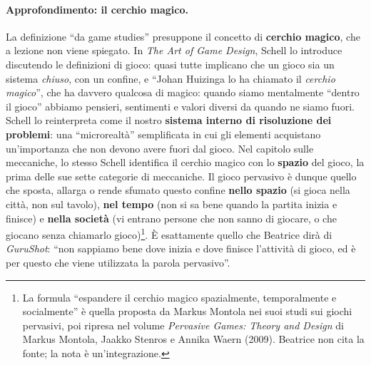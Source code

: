 \paragraph{Approfondimento: il cerchio magico.} La definizione ``da game
studies'' presuppone il concetto di \textbf{cerchio magico}, che a lezione non
viene spiegato. In \emph{The Art of Game Design}, Schell lo introduce
discutendo le definizioni di gioco: quasi tutte implicano che un gioco sia un
sistema \emph{chiuso}, con un confine, e ``Johan Huizinga lo ha chiamato il
\emph{cerchio magico}'', che ha davvero qualcosa di magico: quando siamo
mentalmente ``dentro il gioco'' abbiamo pensieri, sentimenti e valori diversi da
quando ne siamo fuori. Schell lo reinterpreta come il nostro \textbf{sistema
interno di risoluzione dei problemi}: una ``microrealtà'' semplificata in cui gli
elementi acquistano un'importanza che non devono avere fuori dal gioco. Nel
capitolo sulle meccaniche, lo stesso Schell identifica il cerchio magico con lo
\textbf{spazio} del gioco, la prima delle sue sette categorie di meccaniche. Il
gioco pervasivo è dunque quello che sposta, allarga o rende sfumato questo
confine \textbf{nello spazio} (si gioca nella città, non sul tavolo), \textbf{nel
tempo} (non si sa bene quando la partita inizia e finisce) e \textbf{nella
società} (vi entrano persone che non sanno di giocare, o che giocano senza
chiamarlo gioco)\footnote{La formula ``espandere il cerchio magico
spazialmente, temporalmente e socialmente'' è quella proposta da Markus Montola
nei suoi studi sui giochi pervasivi, poi ripresa nel volume \emph{Pervasive
Games: Theory and Design} di Markus Montola, Jaakko Stenros e Annika Waern
(2009). Beatrice non cita la fonte; la nota è un'integrazione.}. È esattamente
quello che Beatrice dirà di \emph{GuruShot}: ``non sappiamo bene dove inizia e
dove finisce l'attività di gioco, ed è per questo che viene utilizzata la parola
pervasivo''.

